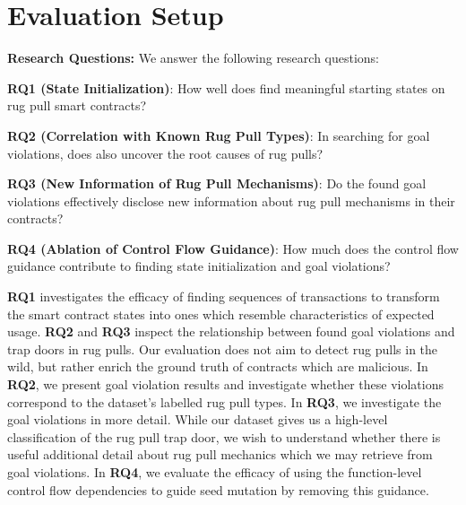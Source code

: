 \section{Evaluation Setup}
\label{ss:sec:evaluation_setup}

\smallskip
\noindent
\textbf{Research Questions:} We answer the following research questions:

\smallskip
\textbf{RQ1 (State Initialization)}:
How well does \spoilsport find meaningful starting states on rug pull smart contracts?

\smallskip
\textbf{RQ2 (Correlation with Known Rug Pull Types)}:
In searching for goal violations, does \spoilsport also uncover the root causes of rug pulls?

\smallskip
\textbf{RQ3 (New Information of Rug Pull Mechanisms)}:
Do the found goal violations effectively disclose new information about rug pull mechanisms in their contracts?

\smallskip
\textbf{RQ4 (Ablation of Control Flow Guidance)}:
How much does the control flow guidance contribute to finding state initialization and goal violations?

\smallskip
{}


\smallskip
\textbf{RQ1} investigates the efficacy of finding sequences of transactions to transform the smart contract states into ones which resemble characteristics of expected usage.
\textbf{RQ2} and \textbf{RQ3} inspect the relationship between found goal violations and trap doors in rug pulls.
Our evaluation does not aim to detect rug pulls in the wild, but rather enrich the ground truth of contracts which are %
malicious.
In \textbf{RQ2}, we present goal violation results and investigate whether these violations correspond to the dataset's labelled rug pull types.
In \textbf{RQ3}, we investigate the goal violations in more detail.
While our dataset gives us a high-level classification of the rug pull trap door, we wish to understand whether there is useful additional detail about rug pull mechanics which we may retrieve from goal violations.
In \textbf{RQ4}, we evaluate the efficacy of using the function-level control flow dependencies to guide seed mutation by removing this guidance.

